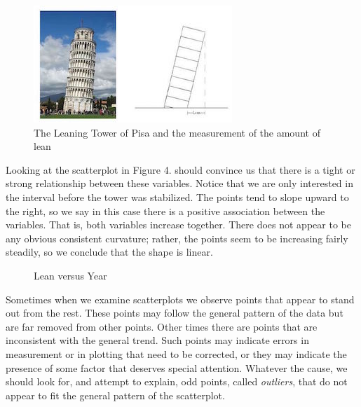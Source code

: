 \documentclass[10pt,]{book}
\theoremstyle{ptxdefinitionnotitle}
\theoremstyle{ptxdefinitiontitle}
\numberwithin{equation}{section}
\begin{document}
\begin{example}
\begin{figure}
\centering
\includegraphics[width=0.8\linewidth]{src/images/chapter01/tower-of-pisa-image.jpg}
\caption{The Leaning Tower of Pisa and the measurement of the amount of lean\label{tower-of-pisa-image}}
\end{figure}
\hypertarget{p-89}{}%
Looking at the scatterplot in Figure 4. should convince us that there is a tight or strong relationship between these variables. Notice that we are only interested in the interval before the tower was stabilized. The points tend to slope upward to the right, so we say in this case there is a positive association between the variables. That is, both variables increase together. There does not appear to be any obvious consistent curvature; rather, the points seem to be increasing fairly steadily, so we conclude that the shape is linear. \\%
\begin{figure}
\centering
{
}
\caption{Lean versus Year\label{scatterplot-tower-of-pisa}}
\end{figure}
\hypertarget{p-90}{}%
Sometimes when we examine scatterplots we observe points that appear to stand out from the rest. These points may follow the general pattern of the data but are far removed from other points. Other times there are points that are inconsistent with the general trend. Such points may indicate errors in measurement or in plotting that need to be corrected, or they may indicate the presence of some factor that deserves special attention. Whatever the cause, we should look for, and attempt to explain, odd points, called \emph{outliers}, that do not appear to fit the general pattern of the scatterplot. \newpage%
\end{example}
\end{document}
